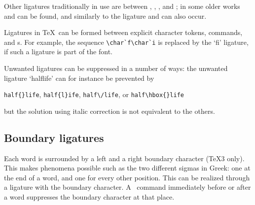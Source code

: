 \documentclass{book}
\begin{document}
Other ligatures traditionally in use are
between , , , and ;
in some older works  and  can be found,
and similarly to the  ligature  and 
can also occur.

Ligatures in \TeX\ can be formed between explicit character
tokens,  commands, and s.
For example,
the sequence \verb-\char`f\char`i- is replaced by the
`fi' ligature, if such a ligature is part of the font.

Unwanted ligatures can be suppressed in a number of ways:
the unwanted ligature `\hbox{halflife}' can
for instance be prevented by
\begin{disp} \verb>half{}life>, \verb>half{l}ife>, \verb>half\/life>,
      or \verb>half\hbox{}life>\end{disp}
but the solution using italic correction is not equivalent
to the others.

\subsection{Boundary ligatures}

Each word is surrounded by a left and a right
boundary character (\TeX3 only).
This makes phenomena possible
such as the two different sigmas in Greek:
one at the end of a word, and one for every other position.
This can be realized through a ligature with the
boundary character. A~ command immediately
before or after a word suppresses the boundary character
at that place.
\end{document}
